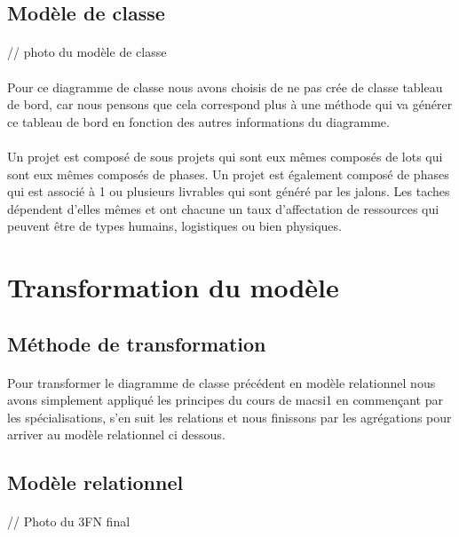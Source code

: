 \documentclass[a4paper, 12pt]{article}
\begin{document}
\subsection{Modèle de classe}
\paragraph{} // photo du modèle de classe
\paragraph{}Pour ce diagramme de classe nous avons choisis de ne pas crée de classe tableau de bord, car nous pensons que cela correspond plus à une méthode qui va générer ce tableau de bord en fonction des autres informations du diagramme.
\paragraph{}Un projet est composé de sous projets qui sont eux mêmes composés de lots qui sont eux mêmes composés de phases. Un projet est également composé de phases qui est associé à 1 ou plusieurs livrables qui sont généré par les jalons. Les taches dépendent d'elles mêmes et ont chacune un taux d'affectation de ressources qui peuvent être de types humains, logistiques ou bien physiques.

\newpage

\section{Transformation du modèle}
\subsection{Méthode de transformation}
\paragraph{}Pour transformer le diagramme de classe précédent en modèle relationnel nous avons simplement appliqué les principes du cours de macsi1 en commençant par les spécialisations, s'en suit les relations et nous finissons par les agrégations pour arriver au modèle relationnel ci dessous.
\subsection{Modèle relationnel}
\paragraph{} // Photo du 3FN final
\end{document}
